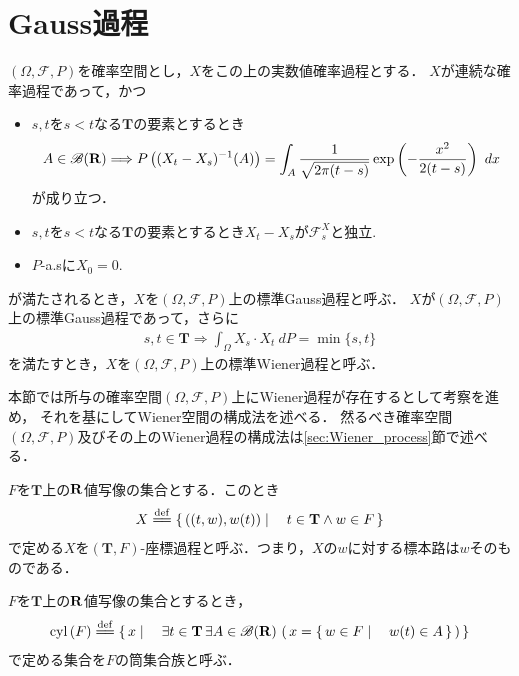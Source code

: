 \section{Gauss過程}
	$(\Omega,\mathscr{F},P)$を確率空間とし，$X$をこの上の実数値確率過程とする．
	$X$が連続な確率過程であって，かつ
	\begin{itemize}
		\item $s,t$を$s < t$なる$\mathbf{T}$の要素とするとき
			\begin{align}
				A \in \mathscr{B}(\mathbf{R}) \Longrightarrow
				P\left((X_t-X_s)^{-1}(A)\right)
				= \int_A \frac{1}{\sqrt{2\pi(t-s)}} \exp\left(-\frac{x^2}{2(t-s)}\right)\ dx
			\end{align}
			が成り立つ．
		
		\item $s,t$を$s < t$なる$\mathbf{T}$の要素とするとき$X_t - X_s$が$\mathscr{F}^X_s$と独立.
			
		\item $P$-a.sに$X_0 = 0$.
	\end{itemize}
	が満たされるとき，$X$を$(\Omega,\mathscr{F},P)$上の標準Gauss過程と呼ぶ．
	$X$が$(\Omega,\mathscr{F},P)$上の標準Gauss過程であって，さらに
	\begin{align}
		s,t \in \mathbf{T} \Longrightarrow \int_\Omega X_s \cdot X_t\ dP = \min{\{s,t\}}
	\end{align}
	を満たすとき，$X$を$(\Omega,\mathscr{F},P)$上の標準Wiener過程と呼ぶ．
	
	本節では所与の確率空間$(\Omega,\mathscr{F},P)$上にWiener過程が存在するとして考察を進め，
	それを基にしてWiener空間の構成法を述べる．
	然るべき確率空間$(\Omega,\mathscr{F},P)$及びその上のWiener過程の構成法は\ref{sec:Wiener_process}節で述べる．
	
	\begin{screen}
		\begin{dfn}[座標過程]
			$F$を$\mathbf{T}$上の$\mathbf{R}$値写像の集合とする．このとき
			\begin{align}
				X \defeq \Set{((t,w),w(t))}{t \in \mathbf{T} \wedge w \in F}
			\end{align}
			で定める$X$を$(\mathbf{T},F)$-座標過程と呼ぶ．つまり，$X$の$w$に対する標本路は$w$そのものである．
		\end{dfn}
	\end{screen}
	
	\begin{screen}
		\begin{dfn}[筒集合]
			$F$を$\mathbf{T}$上の$\mathbf{R}$値写像の集合とするとき，
			\begin{align}
				\cyl{F} \defeq 
				\Set{x}{\exists t \in \mathbf{T}\, \exists A \in \borel{\R}\, 
				\left(\, x = \Set{w \in F}{w(t) \in A}\, \right)}
			\end{align}
			で定める集合を$F$の筒集合族と呼ぶ．
		\end{dfn}
	\end{screen}
	
